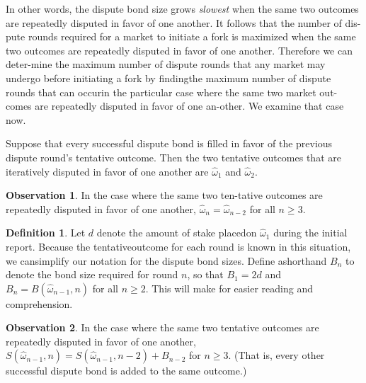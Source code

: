 \documentclass[12pt,floatfix,reprint,nofootinbib,amsmath,amssymb,epsfig,pre,floats,letterpaper,groupedaffiliation]{revtex4-1}
\theoremstyle{definition}
\newtheorem{observation}{Observation}
\theoremstyle{definition}
\newtheorem{definition}{Definition}
\begin{document}
In other words, the dispute bond size grows \textit{slowest} when the same two outcomes are repeatedly disputed in favor of one another. It follows that the number of dis-\linebreak pute rounds required for a market to initiate a fork is maximized when the same two outcomes are repeatedly disputed in favor of one another. Therefore we can deter-\linebreak mine the maximum number of dispute rounds that any market may undergo before initiating a fork by finding\linebreak the maximum number of dispute rounds that can occur\linebreak in the particular case where the same two market out-\linebreak comes are repeatedly disputed in favor of one an-\linebreak other. We examine that case now.

Suppose that every successful dispute bond is filled in favor of the previous dispute round's tentative outcome. Then the two tentative outcomes that are iteratively disputed in favor of one another are $\hat{\omega}_1$ and $\hat{\omega}_2$.

\begin{observation}
In the case where the same two ten-\linebreak tative outcomes are repeatedly disputed in favor of one another, $\hat{\omega}_n = \hat{\omega}_{n-2}$ for all $n \geq 3$.
\end{observation}

\begin{definition}
Let $d$ denote the amount of stake placed\linebreak on $\hat{\omega}_1$ during the initial report. Because the tentative\linebreak outcome for each round is known in this situation, we can\linebreak simplify our notation for the dispute bond sizes. Define a\linebreak shorthand $B_n$ to denote the bond size required for round $n$, so that $B_1 = 2d$ and $B_n = B(\hat{\omega}_{n-1}, n)$ for all $n \geq 2$. This will make for easier reading and comprehension.
\end{definition}

\begin{observation}
In the case where the same two tentative outcomes are repeatedly disputed in favor of one another, $S(\hat{\omega}_{n-1}, n) = S(\hat{\omega}_{n-1}, n-2) + B_{n-2}$ for $n \geq 3$. (That is, every other successful dispute bond is added to the same outcome.)
\end{observation}
\end{document}
